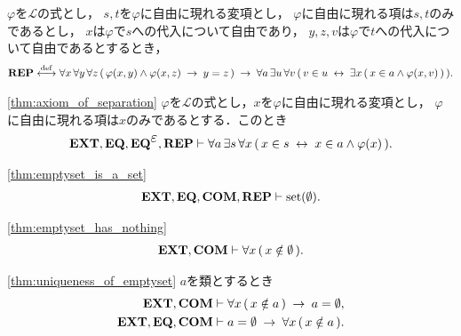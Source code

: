 	\begin{screen}
		\begin{axm}[置換公理]
			$\varphi$を$\mathcal{L}$の式とし，
			$s,t$を$\varphi$に自由に現れる変項とし，
			$\varphi$に自由に現れる項は$s,t$のみであるとし，
			$x$は$\varphi$で$s$への代入について自由であり，
			$y,z,v$は$\varphi$で$t$への代入について自由であるとするとき，
			\begin{align}
				\mbox{{\bf REP}} \overset{\mathrm{def}}{\longleftrightarrow} \forall x\, \forall y\, \forall z\, 
				(\, \varphi(x,y) \wedge \varphi(x,z)
				\hspace{0.25em}\rightarrow\hspace{0.25em} y = z\, )
				\hspace{0.25em}\rightarrow\hspace{0.25em} \forall a\, \exists u\, \forall v\,
				(\, v \in u \hspace{0.25em}\leftrightarrow\hspace{0.25em} \exists x\, (\, x \in a \wedge 
				\varphi(x,v)\, )\, ).
			\end{align}
		\end{axm}
	\end{screen}
	
	\begin{screen}
		\begin{thm}[分出定理]\ref{thm:axiom_of_separation}
			$\varphi$を$\mathcal{L}$の式とし，$x$を$\varphi$に自由に現れる変項とし，
			$\varphi$に自由に現れる項は$x$のみであるとする．このとき
			\begin{align}
				\EXTAX,\EQAX,\EQAXEP,\REPAX \vdash 
				\forall a\, \exists s\, \forall x\,
				(\, x \in s \lrarrow x \in a \wedge \varphi(x)\, ).
			\end{align}
		\end{thm}
	\end{screen}
	
	\begin{screen}
		\begin{thm}\ref{thm:emptyset_is_a_set}
			\begin{align}
				\mbox{{\bf EXT}},\mbox{{\bf EQ}},\mbox{\bf COM},\mbox{{\bf REP}} \vdash \operatorname*{set} (\emptyset).
			\end{align}
		\end{thm}
	\end{screen}
	
	\begin{screen}
		\begin{thm}[空集合はいかなる集合も持たない]\ref{thm:emptyset_has_nothing}
			\begin{align}
				\mbox{{\bf EXT}},\mbox{\bf COM} \vdash \forall x\, (\, x \notin \emptyset\, ).
			\end{align}
		\end{thm}
	\end{screen}
	
	\begin{screen}
		\begin{thm}[空の類は空集合に等しい]\ref{thm:uniqueness_of_emptyset}
			$a$を類とするとき
			\begin{align}
				\mbox{{\bf EXT}},\mbox{\bf COM} &\vdash \forall x\, (\, x \notin a\, ) \hspace{0.25em}\rightarrow\hspace{0.25em} a = \emptyset, \\
				\mbox{{\bf EXT}},\mbox{{\bf EQ}},\mbox{\bf COM} &\vdash a = \emptyset \hspace{0.25em}\rightarrow\hspace{0.25em} \forall x\, (\, x \notin a\, ).
			\end{align}
		\end{thm}
	\end{screen}
	

